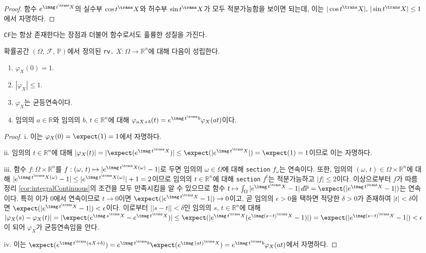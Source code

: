 \begin{proof}
    함수 $e^{\imag\,t^\trans X}$의 실수부 $\cos t^\trans X$와 허수부 $\sin t^\trans X$가 모두 적분가능함을 보이면 되는데, 이는 $|\cos t^\trans X|,\,|\sin t^\trans X|\leq1$에서 자명하다.
\end{proof}

\texttt{CF}는 항상 존재한다는 장점과 더불어 함수로서도 훌륭한 성질을 가진다.

\begin{theorem}
    확률공간 $(\Omega,\,\mathcal{F},\,\mathbb{P})$에서 정의된 \texttt{rv.} $X:\Omega\to\mathbb{R}^n$에 대해 다음이 성립한다.
    \begin{enumerate}
        \item $\varphi_X(0)=1$.
        \item $|\varphi_X|\leq1$.
        \item $\varphi_X$는 균등연속이다.
        \item 임의의 $a\in\mathbb{R}$와 임의의 $b,\,t\in\mathbb{R}^n$에 대해 $\varphi_{aX+b}(t)=e^{\imag\,t^\trans b}\varphi_X(at)$이다.
    \end{enumerate}
\end{theorem}

\begin{proof}
    i. 이는 $\varphi_X(0)=\expect(1)=1$에서 자명하다.

    ii. 임의의 $t\in\mathbb{R}^n$에 대해 $|\varphi_X(t)|=|\expect(e^{\imag\,t^\trans X})|\leq\expect(|e^{\imag\,t^\trans X}|)=\expect(1)=1$이므로 이는 자명하다.

    iii. 함수 $f:\Omega\times\mathbb{R}^n$를 $f:(\omega,\,t)\mapsto|e^{\imag\,t^\trans X(\omega)}-1|$로 두면 임의의 $\omega\in\Omega$에 대해 \texttt{section} $f_\omega$는 연속이다. 또한, 임의의 $(\omega,\,t)\in\Omega\times\mathbb{R}^n$에 대해 $|e^{\imag\,t^\trans X(\omega)}-1|\leq|e^{\imag\,t^\trans X(\omega)}|+1=2$이므로 임의의 $t\in\mathbb{R}^n$에 대해 \texttt{section} $f^t$는 적분가능하고 $|f|\leq2$이다. 이상으로부터 $f$가 따름정리 \ref{cor:integralContinuous}의 조건을 모두 만족시킴을 알 수 있으므로 함수 $t\mapsto\int_\Omega|e^{\imag\,t^\trans X}-1|\,d\mathbb{P}=\expect(|e^{\imag\,t^\trans X}-1|)$는 연속이다. 특히 이가 $0$에서 연속이므로 $t\to0$이면 $\expect(|e^{\imag\,t^\trans X}-1|)\to0$이고, 곧 임의의 $\epsilon>0$을 택하면 적당한 $\delta>0$가 존재하여 $|t|<\delta$이면 $\expect(|e^{\imag\,t^\trans X}-1|)<\epsilon$이다. 이로부터 $||s-t||<\delta$인 임의의 $s,\,t\in\mathbb{R}^n$에 대해 $|\varphi_X(s)-\varphi_X(t)|=|\expect(e^{\imag\,s^\trans X}-e^{\imag\,t^\trans X})|\leq\expect(|e^{\imag\,t^\trans X}(e^{\imag(s-t)^\trans X}-1)|)=\expect(|e^{\imag(s-t)^\trans X}-1|)<\epsilon$이 되어 $\varphi_X$가 균등연속임을 안다.

    iv. 이는 $\expect(e^{\imag\,t^\trans(aX+b)})=e^{\imag\,t^\trans b}\expect(e^{\imag\,(at)^\trans X})=e^{\imag\,t^\trans b}\varphi_X(at)$에서 자명하다.
\end{proof}

